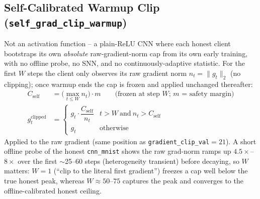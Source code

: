 \documentclass{article}
\begin{document}
\subsection{Self-Calibrated Warmup Clip (\texttt{self\_grad\_clip\_warmup})}
Not an activation function -- a plain-ReLU CNN where each honest client bootstraps its
own \emph{absolute} raw-gradient-norm cap from its own early training, with no offline
probe, no SNN, and no continuously-adaptive statistic. For the first $W$ steps the
client only observes its raw gradient norm $n_t = \lVert g_t \rVert_2$ (no clipping);
once warmup ends the cap is frozen and applied unchanged thereafter:
\begin{align*}
    C_{\text{self}} &= \Big(\max_{t \le W} n_t\Big)\cdot m
    \qquad\text{(frozen at step $W$; $m$ = safety margin)} \\
    g_t^{\text{clipped}} &=
    \begin{cases}
        g_t \cdot \dfrac{C_{\text{self}}}{n_t} & t > W \ \text{and}\ n_t > C_{\text{self}} \\
        g_t & \text{otherwise}
    \end{cases}
\end{align*}
Applied to the raw gradient (same position as \texttt{gradient\_clip\_val}$=21$). A
short offline probe of the honest \texttt{cnn\_mnist} shows the raw grad-norm ramps up
$4.5\times$--$8\times$ over the first $\sim$25--60 steps (heterogeneity transient)
before decaying, so $W$ matters: $W=1$ (``clip to the literal first gradient'') freezes
a cap well below the true honest peak, whereas $W\approx 50$--$75$ captures the peak and
converges to the offline-calibrated honest ceiling.
\end{document}

